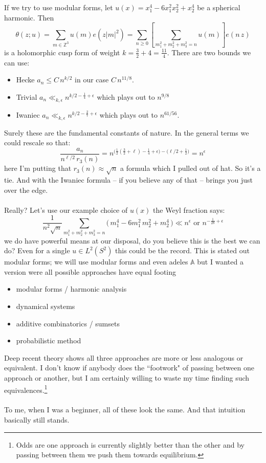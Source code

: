 \documentclass[12pt]{article}
\begin{document}
\noindent If we try to use modular forms, let $u(x) = x_1^4 - 6 x_1^2 x_2^2 + x_2^4$ be a spherical harmonic.  Then
$$ \theta(z; u) = \sum_{m \in \mathbb{Z}^3}  u(m) e(z |m|^2) = \sum_{n \geq 0} \left[ \sum_{m_1^2 + m_2^2 + m_3^2 = n} u(m) \right] e(n \, z)$$
is a holomorphic cusp form of weight $k=\frac{3}{2} + 4 = \frac{11}{4} $.  There are two bounds we can use:
\begin{itemize}
\item Hecke $a_n \leq C \, n^{k/2}  $ in our case $C \, n^{11/8} $.
\item Trivial \;\;$a_n \ll_{k, \epsilon} n^{k/2 - \frac{1}{4} + \epsilon} $
which plays out to $n^{9/8}$
\item Iwaniec $a_n \ll_{k, \epsilon} n^{k/2 - \frac{2}{7} + \epsilon} $ 
which plays out to $n^{61/56}$.
\end{itemize}
Surely these are the fundamental constants of nature.  In the general terms we could rescale so that:
$$ \frac{a_n}{n^{\ell/2} \, r_3(n)} = n^{ \big( \frac{1}{2}(\frac{3}{2}+ \ell) - \frac{1}{4} + \epsilon \big) - \big( \ell/2 + \frac{1}{2}\big)} = n^\epsilon$$
here I'm putting that $r_3(n) \approx \sqrt{n}$ a formula which I pulled out of hat.  So it's a tie.  And with the Iwaniec formula -- if you believe any of that -- brings you just over the edge. \\ \\
Really? Let's use our example choice of $u(x)$ the Weyl fraction says:
$$ \frac{1}{n^2\sqrt{n}} \sum_{m_1^2 + m_2^2 + m_3^2 = n} \big( \, m_1^4 - 6 m_1^2\, m_2^2 + m_2^4 \,\big) \ll n^{\epsilon} \text{ or } n^{-\frac{1}{28} + \epsilon} $$
we do have powerful means at our disposal, do you believe this is the best we can do?  Even for a single $u \in L^2(S^2)$ this could be the record.  This is stated out modular forms; we will use modular forms and even adeles $\mathbb{A}$ but I wanted a version were all possible approaches have equal footing
\begin{itemize}
\item modular forms / harmonic analysis
\item dynamical systems
\item additive combinatorics / sumsets
\item probabilistic method
\end{itemize}
Deep recent theory shows all three approaches are more or less analogous or equivalent.  I don't know if anybody does the ``footwork" of passing between one approach or another, but I am certainly willing to waste my time finding such equivalences.\footnote{Odds are one approach is currently slightly better than the other and by passing between them we push them towards equilibrium.} \\ \\
To me, when I was a beginner, all of these look the same.  And that intuition basically still stands.
\end{document}
